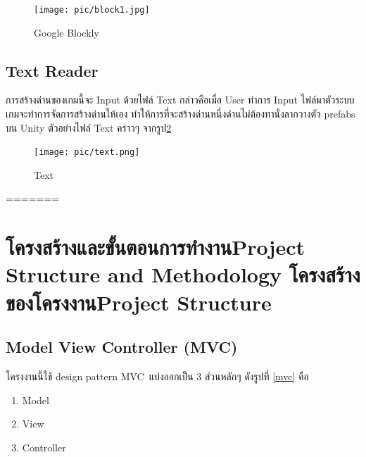 \begin{figure}
\begin{center}
\texttt{[image: pic/block1.jpg]}
\end{center}
\caption[Poem]{Google Blockly}
\label{block}
\end{figure}

\section{Text Reader}
การสร้างด่านของเกมนี้จะ Input ด้วยไฟล์ Text กล่าวคือเมื่อ User ทำการ Input ไฟล์มาตัวระบบเกมจะทำการจัดการสร้างด่านให้เอง
ทำให้การที่จะสร้างด่านหนึ่งด่านไม่ต้องทานั่งลากวางตัว prefabs บน Unity ตัวอย่างไฟล์ Text คร่าวๆ จากรูป\ref{txt}
\begin{figure}
    \begin{center}
    \texttt{[image: pic/text.png]}
    \end{center}
    \caption[Poem]{Text}
    \label{txt}
    \end{figure}
=======
\chapter{\ifproject%
\ifcpe โครงสร้างและขั้นตอนการทำงาน\else Project Structure and Methodology\fi
\else%
\ifcpe โครงสร้างของโครงงาน\else Project Structure\fi
\fi
}


\makeatletter


\makeatother

\section{Model View Controller (MVC)}
โครงงานนี้ใช้ design pattern MVC~\cite{mvc}แบ่งออกเป็น 3 ส่วนหลักๆ ดังรูปที่ \ref{mvc} คือ 
\begin{enumerate}
    \item Model
    \item View
    \item Controller
\end{enumerate}


